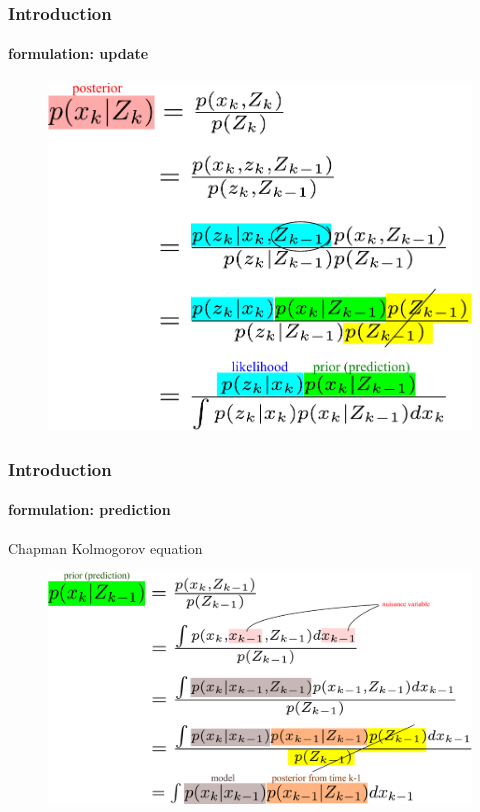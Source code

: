 \begin{frame}
\frametitle{Introduction}
\framesubtitle{formulation: update}
\logoCSIPCPL\mypagenum
	\begin{figure}
		\includegraphics[width=1.0\textwidth]{figs/TRK_EQN_update.pdf}
	\end{figure}
\end{frame}



\begin{frame}
\frametitle{Introduction}
\framesubtitle{formulation: prediction}
\logoCSIPCPL\mypagenum
	Chapman Kolmogorov equation
	\begin{figure}
		\includegraphics[width=1.0\textwidth]{figs/TRK_EQN_prediction.pdf}
	\end{figure}
\end{frame}


